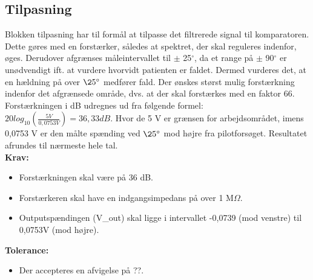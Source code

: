 \subsection{Tilpasning} 
Blokken tilpasning har til formål at tilpasse det filtrerede signal til komparatoren. Dette gøres med en forstærker, således at spektret, der skal reguleres indenfor, øges. Derudover afgrænses måleintervallet til $\pm$ 25$^{\circ}$, da et range på $\pm$ 90$^{\circ}$ er unødvendigt ift. at vurdere hvorvidt patienten er faldet. Dermed vurderes det, at en hældning på over $\25^{\circ}$ medfører fald. Der ønskes størst mulig forstærkning indenfor det afgrænsede område, dvs. at der skal forstærkes med en faktor 66.  Forstærkningen i dB udregnes ud fra følgende formel: 
$20log_{10}(\frac{5 V}{0,0753 V})=36,33 dB$. 
Hvor de 5 V er grænsen for arbejdsområdet, imens 0,0753 V er den målte spænding ved $\25^{\circ}$ mod højre fra pilotforsøget. Resultatet afrundes til nærmeste hele tal. \\

\textbf{Krav:}
\begin{itemize}
\item Forstærkningen skal være på 36 dB.
\item Forstærkeren skal have en indgangsimpedans på over 1 M$\Omega$. 
\item Outputspændingen (V_{out}) skal ligge i intervallet -0,0739 (mod venstre) til 0,0753V (mod højre).
\end{itemize}
\textbf{Tolerance:}
\begin{itemize}
\item Der accepteres en afvigelse på ??.
\end{itemize}
